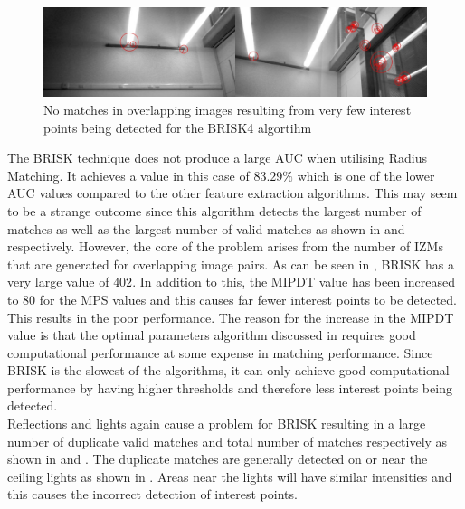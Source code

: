 \documentclass{report}
\begin{document}
\begin{figure}
  \centering
    \includegraphics[width=1.0\textwidth]{../Drawings/Matching/noMatchesBrisk4.jpg}
    \caption{No matches in overlapping images resulting from very few interest points being detected for the BRISK4 algortihm }
    \label{fig:noMatchesBrisk4}
\end{figure}

The BRISK technique does not produce a large AUC when utilising Radius Matching. It achieves a  value in this case of $83.29\%$ which is one of the lower AUC values compared to the other feature extraction algorithms. This may seem to be a strange outcome since this algorithm detects the largest number of matches as well as the largest number of valid matches as shown in  and  respectively. However, the core of the problem arises from the number of IZMs that are generated for overlapping image pairs. As can be seen in , BRISK has a very large value of $402$. In addition to this, the MIPDT value has been increased to $80$ for the MPS values and this causes far fewer interest points to be detected. This results in the poor performance. The reason for the increase in the MIPDT value is that the optimal parameters algorithm discussed in  requires good computational performance at some expense in matching performance. Since BRISK is the slowest of the algorithms, it can only achieve good computational performance by having higher thresholds and therefore less interest points being detected.\\

Reflections and lights again cause a problem for BRISK resulting in a large number of duplicate valid matches and total number of matches respectively as shown in  and . The duplicate matches are generally detected on or near the ceiling lights as shown in . Areas near the lights will have similar intensities and this causes the incorrect detection of interest points.\\
\end{document}
